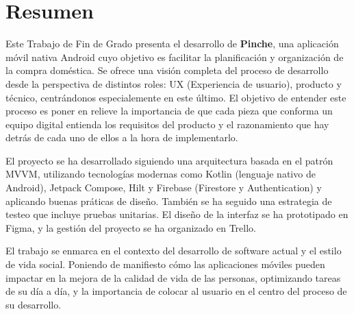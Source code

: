\chapter*{Resumen}

Este Trabajo de Fin de Grado presenta el desarrollo de \textbf{Pinche}, una aplicación móvil nativa Android cuyo objetivo es facilitar la planificación y organización de la compra doméstica. Se ofrece una visión completa del proceso de desarrollo desde la perspectiva de distintos roles: UX (Experiencia de usuario), producto y técnico, centrándonos especialemente en este último. El objetivo de entender este proceso es poner en relieve la importancia de que cada pieza que conforma un equipo digital entienda los requisitos del producto y el razonamiento que hay detrás de cada uno de ellos a la hora de implementarlo.

El proyecto se ha desarrollado siguiendo una arquitectura basada en el patrón MVVM, utilizando tecnologías modernas como Kotlin (lenguaje nativo de Android), Jetpack Compose, Hilt y Firebase (Firestore y Authentication) y aplicando buenas práticas de diseño. También se ha seguido una estrategia de testeo que incluye pruebas unitarias. El diseño de la interfaz se ha prototipado en Figma, y la gestión del proyecto se ha organizado en Trello.

El trabajo se enmarca en el contexto del desarrollo de software actual y el estilo de vida social. Poniendo de manifiesto cómo las aplicaciones móviles pueden impactar en la mejora de la calidad de vida de las personas, optimizando tareas de su día a día, y la importancia de colocar al usuario en el centro del proceso de su desarrollo.
